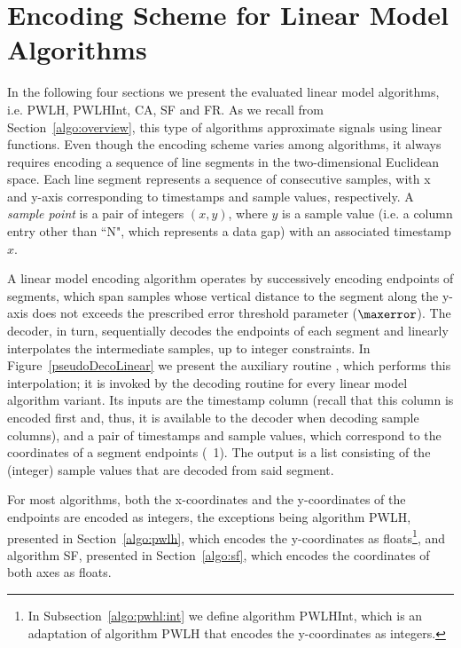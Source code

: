
\section{Encoding Scheme for Linear Model Algorithms}
\label{algo:decolinear}


In the following four sections we present the evaluated linear model algorithms, i.e. PWLH, PWLHInt, CA, SF and FR. As we recall from Section~\ref{algo:overview}, this type of algorithms approximate signals using linear functions. Even though the encoding scheme varies among algorithms, it always requires encoding a sequence of line segments in the two-dimensional Euclidean space. Each line segment represents a sequence of consecutive samples, with x and y-axis corresponding to timestamps and sample values, respectively. A \textit{sample point} is a pair of integers $(x,y)$, where $y$ is a sample value (i.e. a column entry other than ``N", which represents a data gap) with an associated timestamp $x$.


A linear model encoding algorithm operates by successively encoding endpoints of segments, which span samples whose vertical distance to the segment along the y-axis does not exceeds the prescribed error threshold parameter ($\maxerror$). The decoder, in turn, sequentially decodes the endpoints of each segment and linearly interpolates the intermediate samples, up to integer constraints. In Figure~\ref{pseudoDecoLinear} we present the auxiliary routine \decodeSegment, which performs this interpolation; it is invoked by the decoding routine for every linear model algorithm variant. Its inputs are the timestamp column (recall that this column is encoded first and, thus, it is available to the decoder when decoding sample columns), and a pair of timestamps and sample values, which correspond to the coordinates of a segment endpoints (\Line~1). The output is a list consisting of the (integer) sample values that are decoded from said segment.





\clearpage


\newcommand{\pwlhfoot}{\footnote{In Subsection~\ref{algo:pwhl:int} we define algorithm PWLHInt, which is an adaptation of algorithm PWLH that encodes the y-coordinates as integers.}}

For most algorithms, both the x-coordinates and the y-coordinates of the endpoints are encoded as integers, the exceptions being algorithm PWLH, presented in Section~\ref{algo:pwlh}, which encodes the y-coordinates as floats\pwlhfoot, and algorithm SF, presented in Section~\ref{algo:sf}, which encodes the coordinates of both axes as floats.



